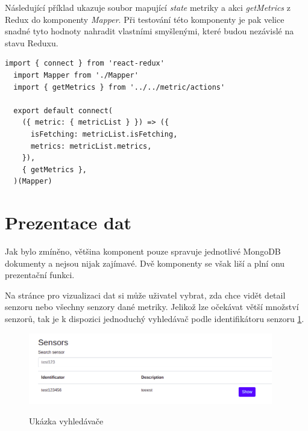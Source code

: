\documentclass[thesis=M,czech]{FITthesis}[2018/10/20]
\begin{document}
Následující příklad ukazuje soubor mapující \textit{state} metriky a akci \textit{getMetrics} z Redux do komponenty \textit{Mapper}. Při testování této komponenty je pak velice snadné tyto hodnoty nahradit vlastními smyšlenými, které budou nezávislé na stavu Reduxu.
\begin{lstlisting}
import { connect } from 'react-redux'
  import Mapper from './Mapper'
  import { getMetrics } from '../../metric/actions'
  
  export default connect(
    ({ metric: { metricList } }) => ({
      isFetching: metricList.isFetching,
      metrics: metricList.metrics,
    }), 
    { getMetrics },
  )(Mapper)
\end{lstlisting}

\section{Prezentace dat}
Jak bylo zmíněno, většina komponent pouze spravuje jednotlivé MongoDB dokumenty a nejsou nijak zajímavé. Dvě komponenty se však liší a plní onu prezentační funkci.

Na stránce pro vizualizaci dat si může uživatel vybrat, zda chce vidět detail senzoru nebo všechny senzory dané metriky. Jelikož lze očekávat větší množství senzorů, tak je k dispozici jednoduchý vyhledávač podle identifikátoru senzoru \ref{fig:sensor_search}.

\begin{figure}[h]
\caption{Ukázka vyhledávače}
\centering
\includegraphics[width=0.95\textwidth]{sensor-search}
\label{fig:sensor_search}
\end{figure}

\newpage
\end{document}
